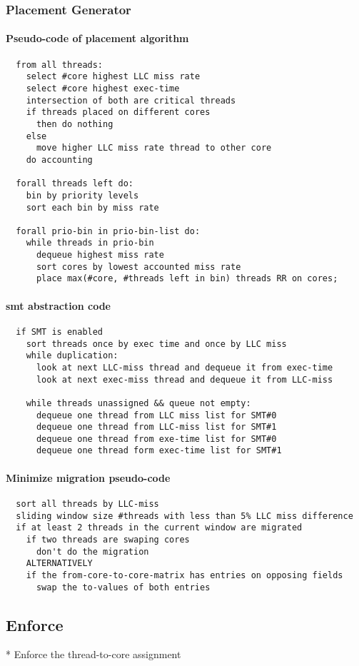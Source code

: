   \subsubsection{Placement Generator}

  \paragraph{Pseudo-code of placement algorithm}
  \begin{verbatim}
  from all threads:
    select #core highest LLC miss rate
    select #core highest exec-time
    intersection of both are critical threads
    if threads placed on different cores
      then do nothing
    else
      move higher LLC miss rate thread to other core
    do accounting

  forall threads left do:
    bin by priority levels
    sort each bin by miss rate

  forall prio-bin in prio-bin-list do:
    while threads in prio-bin
      dequeue highest miss rate
      sort cores by lowest accounted miss rate
      place max(#core, #threads left in bin) threads RR on cores;
  \end{verbatim}

  \paragraph{\gls{smt} abstraction code}
  \begin{verbatim}
  if SMT is enabled
    sort threads once by exec time and once by LLC miss
    while duplication:
      look at next LLC-miss thread and dequeue it from exec-time
      look at next exec-miss thread and dequeue it from LLC-miss

    while threads unassigned && queue not empty:
      dequeue one thread from LLC miss list for SMT#0
      dequeue one thread from LLC-miss list for SMT#1
      dequeue one thread from exe-time list for SMT#0
      dequeue one thread form exec-time list for SMT#1
  \end{verbatim}

  \paragraph{Minimize migration pseudo-code}
  \begin{verbatim}
  sort all threads by LLC-miss
  sliding window size #threads with less than 5% LLC miss difference
  if at least 2 threads in the current window are migrated
    if two threads are swaping cores
      don't do the migration
    ALTERNATIVELY
    if the from-core-to-core-matrix has entries on opposing fields
      swap the to-values of both entries
  \end{verbatim}



\subsection{Enforce}

  * Enforce the thread-to-core assignment


